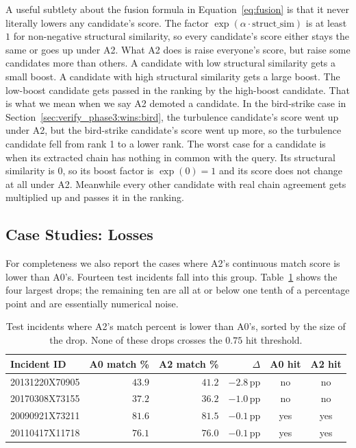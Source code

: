 \documentclass[11pt]{article}
\begin{document}
A useful subtlety about the fusion formula in Equation~\ref{eq:fusion} is that it never literally lowers any candidate's score. The factor $\exp(\alpha \cdot \text{struct\_sim})$ is at least $1$ for non-negative structural similarity, so every candidate's score either stays the same or goes up under A2. What A2 does is raise everyone's score, but raise some candidates more than others. A candidate with low structural similarity gets a small boost. A candidate with high structural similarity gets a large boost. The low-boost candidate gets passed in the ranking by the high-boost candidate. That is what we mean when we say A2 demoted a candidate. In the bird-strike case in Section~\ref{sec:verify_phase3:wins:bird}, the turbulence candidate's score went up under A2, but the bird-strike candidate's score went up more, so the turbulence candidate fell from rank 1 to a lower rank. The worst case for a candidate is when its extracted chain has nothing in common with the query. Its structural similarity is $0$, so its boost factor is $\exp(0) = 1$ and its score does not change at all under A2. Meanwhile every other candidate with real chain agreement gets multiplied up and passes it in the ranking.

\subsection{Case Studies: Losses}
\label{sec:verify_phase3:losses}

For completeness we also report the cases where A2's continuous match score is lower than A0's. Fourteen test incidents fall into this group. Table~\ref{tab:losses} shows the four largest drops; the remaining ten are all at or below one tenth of a percentage point and are essentially numerical noise.

\begin{table}[h]
\centering
\caption{Test incidents where A2's match percent is lower than A0's, sorted by the size of the drop. None of these drops crosses the $0.75$ hit threshold.}
\label{tab:losses}
\begin{tabular}{lrrrcc}
\toprule
Incident ID & A0 match \% & A2 match \% & $\Delta$ & A0 hit & A2 hit \\
\midrule
20131220X70905 & $43.9$ & $41.2$ & $-2.8\,\text{pp}$ & no & no \\
20170308X73155 & $37.2$ & $36.2$ & $-1.0\,\text{pp}$ & no & no \\
20090921X73211 & $81.6$ & $81.5$ & $-0.1\,\text{pp}$ & yes & yes \\
20110417X11718 & $76.1$ & $76.0$ & $-0.1\,\text{pp}$ & yes & yes \\
\bottomrule
\end{tabular}
\end{table}
\end{document}
